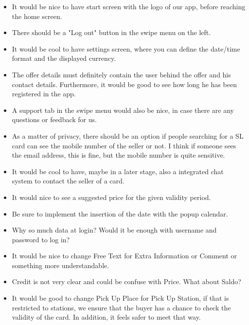 \documentclass[11pt,twoside,a4paper]{report}
\begin{document}
\begin{itemize}

\item It would be nice to have start screen with the logo of our app, before reaching the home screen.

\item There should be a "Log out" button in the swipe menu on the left.

\item It would be cool to have settings screen, where you can define the date/time format and the displayed currency.

\item The offer details must definitely contain the user behind the offer and his contact details. Furthermore, it would be good to see how long he has been registered in the app.

\item A support tab in the swipe menu would also be nice, in case there are any questions or feedback for us.

\item As a matter of privacy, there should be an option if people searching for a SL card can see the mobile number of the seller or not. I think if someone sees the email address, this is fine, but the mobile number is quite sensitive.

\item It would be cool to have, maybe in a later stage, also a integrated chat system to contact the seller of a card.

\item It would nice to see a suggested price for the given validity period.

\item Be sure to implement the insertion of the date with the popup calendar.

\item Why so much data at login? Would it be enough with username and password to log in?

\item It would be nice to change Free Text for Extra Information or Comment or something more understandable.

\item Credit is not very clear and could be confuse with Price. What about Saldo?

\item It would be good to change Pick Up Place for Pick Up Station, if that is restricted to stations, we ensure that the buyer has a chance to check the validity of the card. In addition, it feels safer to meet that way.

\end{itemize}
\end{document}
